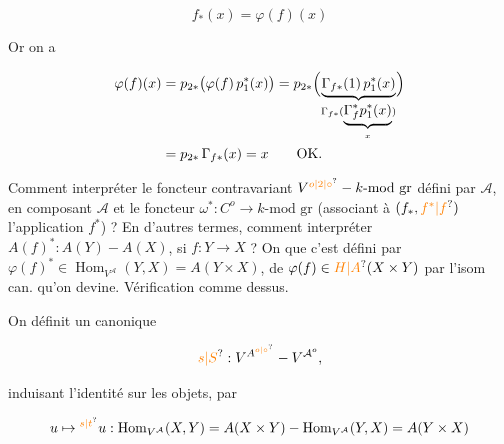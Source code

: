 \[
f_*(x)=\varphi(f)(x)
\]

Or on a


\[
\begin{aligned}
\varphi(f)(x)&=p_{2*}\bigl(\varphi(f)\,p_1^*(x)\bigr)
=p_{2*}\Bigl(\underbrace{\Gamma_{f*}(1)\,p_1^*(x)}_{\Gamma_{f*}(\underbrace{\Gamma_f^*p_1^*(x)}_{x})}\Bigr)\\
&=p_{2*}\,\Gamma_{f*}(x)=x\qquad\text{OK.}
\end{aligned}
\]

\uline{}  Comment interpréter le foncteur contravariant $V^{\unsure{o|2|\circ}}\mathbin{-}k\text{-mod gr}$ défini par $\mathcal A$, en composant $\mathcal A$ et le foncteur $\omega^*:C^o\longrightarrow k\text{-mod gr}$ (associant à $(f_*,\unsure{f^*|f})$ l'application $f^*$) ? En d'autres termes, comment interpréter $A(f)^*:A(Y)\mathbin{-}A(X)$, si $f:Y\longrightarrow X$ ? On  que c'est défini par $\varphi(f)^*\in\operatorname{Hom}_{V^{\mathcal A}}(Y,X)=A(Y\times X)$,  de $\varphi(f)\in\unsure{H|A}(X\times Y)$ par l'isom can. qu'on devine. Vérification comme dessus.

On définit un  canonique

\[
\unsure{s|S}:V^{A^{\unsure{o|\circ}}}\mathbin{-}V^{\mathcal A^{o}},
\]


induisant l'identité sur les objets, par

\[
u\mapsto{}^{\unsure{s|t}}u:\operatorname{Hom}_{V^{\mathcal A}}(X,Y)=A(X\times Y)\mathbin{-}\operatorname{Hom}_{V^{\mathcal A}}(Y,X)=A(Y\times X)
\]

